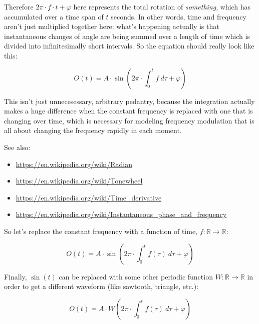 \documentclass{article}
\begin{document}
    Therefore $2\pi \cdot f \cdot t + \varphi$ here represents the total
    rotation of \textit{something}, which has accumulated over a time span of
    $t$ seconds. In other words, time and frequency aren't just multiplied
    together here: what's happening actually is that instantaneous changes of
    angle are being summed over a length of time which is divided into
    infinitesimally short intervals. So the equation should really look like
    this:

    \begin{equation}
      O(t) =
        A \cdot \sin \left( 2\pi \cdot \int_{0}^{t} f \  d\tau + \varphi \right)
    \end{equation}

    This isn't just unnecesessary, arbitrary pedantry, because the integration
    actually makes a huge difference when the constant frequency is replaced
    with one that is changing over time, which is necessary for modeling
    frequency modulation that is all about changing the frequency rapidly in
    each moment.

    See also:

    \begin{itemize}
      \item \url{https://en.wikipedia.org/wiki/Radian}
      \item \url{https://en.wikipedia.org/wiki/Tonewheel}
      \item \url{https://en.wikipedia.org/wiki/Time\_derivative}
      \item \url{https://en.wikipedia.org/wiki/Instantaneous\_phase\_and\_frequency}
    \end{itemize}

    So let's replace the constant frequency with a function of time,
    $f \colon \mathbb{R} \to \mathbb{R}$:

    \begin{equation}
      O(t)
        = A \cdot \sin \left(
            2\pi \cdot \int_{0}^{t} f(\tau) \  d\tau + \varphi
          \right)
    \end{equation}

    Finally, $\sin(t)$ can be replaced with some other periodic function
    $W \colon \mathbb{R} \to \mathbb{R}$ in order to get a different waveform
    (like sawtooth, triangle, etc.):

    \begin{equation}\label{eqoscillator}
      O(t)
        = A \cdot W \left(
            2\pi \cdot \int_{0}^{t} f(\tau) \  d\tau + \varphi
          \right)
    \end{equation}
\end{document}
